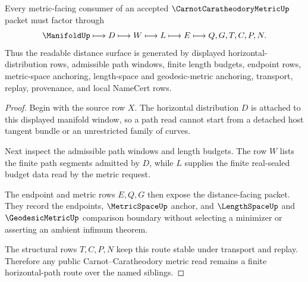 \begin{theorem}
\label{thm:carnot-caratheodory-metric-horizontal-path-route}
Every metric-facing consumer of an accepted $\CarnotCaratheodoryMetricUp$ packet must factor through
$$
\ManifoldUp \longmapsto D \longmapsto W \longmapsto L \longmapsto E \longmapsto Q,G,T,C,P,N .
$$
Thus the readable distance surface is generated by displayed horizontal-distribution rows, admissible path windows, finite length budgets, endpoint rows, metric-space anchoring, length-space and geodesic-metric anchoring, transport, replay, provenance, and local NameCert rows.
\end{theorem}
\begin{proof}
Begin with the source row $X$. The horizontal distribution $D$ is attached to this displayed manifold window, so a path read cannot start from a detached host tangent bundle or an unrestricted family of curves.

Next inspect the admissible path windows and length budgets. The row $W$ lists the finite path segments admitted by $D$, while $L$ supplies the finite real-sealed budget data read by the metric request.

The endpoint and metric rows $E,Q,G$ then expose the distance-facing packet. They record the endpoints, $\MetricSpaceUp$ anchor, and $\LengthSpaceUp$ and $\GeodesicMetricUp$ comparison boundary without selecting a minimizer or asserting an ambient infimum theorem.

The structural rows $T,C,P,N$ keep this route stable under transport and replay. Therefore any public Carnot--Caratheodory metric read remains a finite horizontal-path route over the named siblings.
\end{proof}


